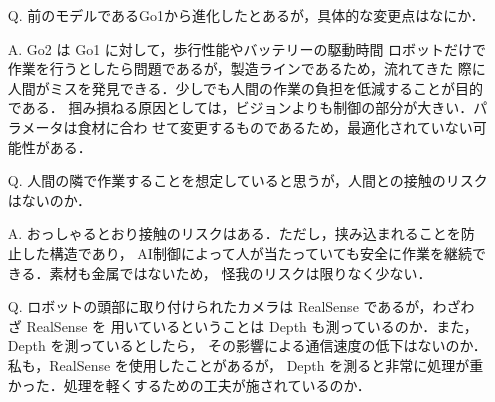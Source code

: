 \documentclass{jsarticle}
\begin{document}
\begin{itemize}
  \addtolength{\itemindent}{5.4zw}
  \item [Q.]前のモデルであるGo1から進化したとあるが，具体的な変更点はなにか．
  \vspace*{1zh}

  \item [A.]Go2 は Go1 に対して，歩行性能やバッテリーの駆動時間
  \hspace*{5.5zw}ロボットだけで作業を行うとしたら問題であるが，製造ラインであるため，流れてきた
  \hspace*{5.5zw}際に人間がミスを発見できる．少しでも人間の作業の負担を低減することが目的である．
  \hspace*{5.5zw}掴み損ねる原因としては，ビジョンよりも制御の部分が大きい．パラメータは食材に合わ
  \hspace*{5.5zw}せて変更するものであるため，最適化されていない可能性がある．


  \newpage
  \vspace*{-10zh}

  \item [Q.]人間の隣で作業することを想定していると思うが，人間との接触のリスクはないのか．
  \vspace*{1zh}

  \item [A.]おっしゃるとおり接触のリスクはある．ただし，挟み込まれることを防止した構造であり，
  \hspace*{5.5zw}AI制御によって人が当たっていても安全に作業を継続できる．素材も金属ではないため，
  \hspace*{5.5zw}怪我のリスクは限りなく少ない．\\
  \vspace*{1zh}


  \item [Q.]ロボットの頭部に取り付けられたカメラは RealSense であるが，わざわざ RealSense を
  \hspace*{5.5zw}用いているということは Depth も測っているのか．また，Depth を測っているとしたら，
  \hspace*{5.5zw}その影響による通信速度の低下はないのか．私も，RealSense を使用したことがあるが，
  \hspace*{5.5zw}Depth を測ると非常に処理が重かった．処理を軽くするための工夫が施されているのか．
  \vspace*{1zh}


\end{itemize}
\end{document}
